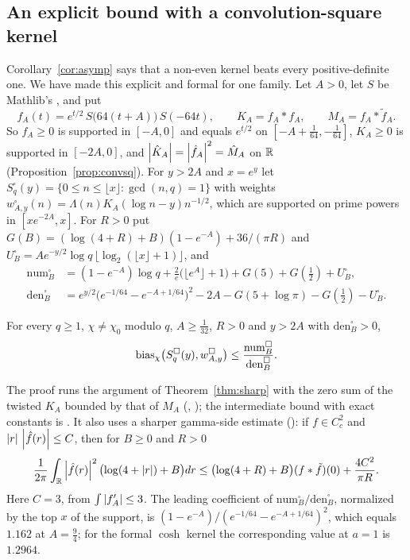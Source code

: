 \subsection{An explicit bound with a convolution-square kernel}
Corollary~\ref{cor:asymp} says that a non-even kernel beats every positive-definite one. We have made this explicit
and formal for one family. Let $A>0$, let $S$ be Mathlib's , and put
\[
  f_A(t)=e^{t/2}\,S\bigl(64(t+A)\bigr)\,S(-64t),\qquad K_A=f_A*f_A,\qquad M_A=f_A*\tilde f_A .
\]
So $f_A\ge0$ is supported in $[-A,0]$ and equals $e^{t/2}$ on $[-A+\frac1{64},-\frac1{64}]$, $K_A\ge0$ is supported in
$[-2A,0]$, and $\left\lvert \hat K_A \right\rvert=\left\lvert \hat f_A \right\rvert^2=\hat M_A$ on $\mathbb{R}$ (Proposition~\ref{prop:convsq}). For $y>2A$ and $x=e^y$
let $S^\square_q(y)=\{0\le n\le\lfloor x\rfloor:\gcd(n,q)=1\}$ with weights
$w^\square_{A,y}(n)=\Lambda(n)K_A(\log n-y)n^{-1/2}$, which are supported on prime powers in $[xe^{-2A},x]$. For $R>0$
put $G(B)=(\log(4+R)+B)(1-e^{-A})+36/(\pi R)$ and $U^\square_B=Ae^{-y/2}\log q\,\lfloor\log_2(\lfloor x\rfloor+1)\rfloor$, and
\begin{align*}
  \mathrm{num}^\square_B&=(1-e^{-A})\log q+\tfrac2e\bigl(\lfloor e^{A}\rfloor+1\bigr)+G(5)+G(\tfrac12)+U^\square_B,\\
  \mathrm{den}^\square_B&=e^{y/2}\bigl(e^{-1/64}-e^{-A+1/64}\bigr)^2-2A-G(5+\log\pi)-G(\tfrac12)-U^\square_B .
\end{align*}

\begin{theorem}\label{thm:convclosed}
For every $q\ge1$, $\chi\ne\chi_0$ modulo $q$, $A\ge\frac1{32}$, $R>0$ and $y>2A$ with $\mathrm{den}^\square_B>0$,
\[
  \operatorname{bias}_\chi\bigl(S^\square_q(y),w^\square_{A,y}\bigr)\le\frac{\mathrm{num}^\square_B}{\mathrm{den}^\square_B}.
\]
\end{theorem}

The proof runs the argument of Theorem~\ref{thm:sharp} with the zero sum of the twisted $K_A$ bounded by that of $M_A$
(, ); the intermediate bound with exact constants is
. It also uses a sharper gamma-side estimate (): if
$f\in C^2_c$ and $\left\lvert r \right\rvert\,\left\lvert \hat f(r) \right\rvert\le C$, then for $B\ge0$ and $R>0$
\[
  \frac1{2\pi}\int_{\mathbb{R}}\left\lvert \hat f(r) \right\rvert^2\bigl(\log(4+\left\lvert r \right\rvert)+B\bigr)dr\le\bigl(\log(4+R)+B\bigr)(f*\tilde f)(0)+\frac{4C^2}{\pi R}.
\]
Here $C=3$, from $\int\left\lvert f_A' \right\rvert\le3$. The leading coefficient of $\mathrm{num}^\square_B/\mathrm{den}^\square_B$, normalized by the top
$x$ of the support, is $(1-e^{-A})/(e^{-1/64}-e^{-A+1/64})^2$, which equals $1.162$ at $A=\frac94$; for the formal $\cosh$ kernel
the corresponding value at $a=1$ is $1.2964$.

